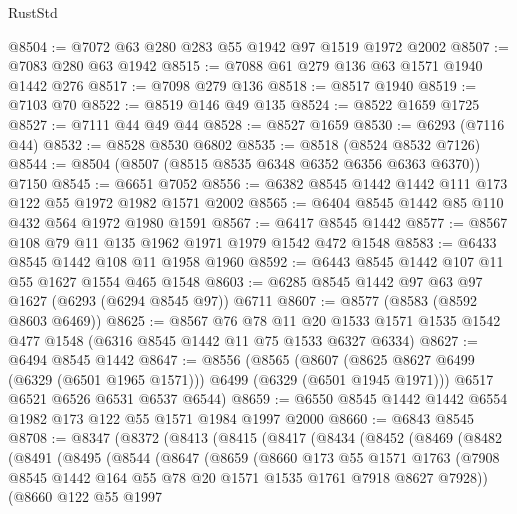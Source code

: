 \begin{lexlean}{RustStd}
\begin{coremodule}
{\begin{coremodule}
{{{{{{{{{{{{{{{{{{{{{{{{{{{{{{{{{{{@8504 := @7072 @63 @280 @283 @55 @1942 @97 @1519 @1972 @2002
@8507 := @7083 @280 @63 @1942
@8515 := @7088 @61 @279 @136 @63 @1571 @1940 @1442 @276
@8517 := @7098 @279 @136
@8518 := @8517 @1940
@8519 := @7103 @70
@8522 := @8519 @146 @49 @135
@8524 := @8522 @1659 @1725
@8527 := @7111 @44 @49 @44
@8528 := @8527 @1659
@8530 := @6293 (@7116 @44)
@8532 := @8528 @8530 @6802
@8535 := @8518 (@8524 @8532 @7126)
@8544 := @8504 (@8507 (@8515 @8535 @6348 @6352 @6356 @6363 @6370)) @7150
@8545 := @6651 @7052
@8556 := @6382 @8545 @1442 @1442 @111 @173 @122 @55 @1972 @1982 @1571 @2002
@8565 := @6404 @8545 @1442 @85 @110 @432 @564 @1972 @1980 @1591
@8567 := @6417 @8545 @1442
@8577 := @8567 @108 @79 @11 @135 @1962 @1971 @1979 @1542 @472 @1548
@8583 := @6433 @8545 @1442 @108 @11 @1958 @1960
@8592 := @6443 @8545 @1442 @107 @11 @55 @1627 @1554 @465 @1548
@8603 := @6285 @8545 @1442 @97 @63 @97 @1627 (@6293 (@6294 @8545 @97)) @6711
@8607 := @8577 (@8583 (@8592 @8603 @6469))
@8625 := @8567
    @76
    @78
    @11
    @20
    @1533
    @1571
    @1535
    @1542
    @477
    @1548
    (@6316 @8545 @1442 @11 @75 @1533 @6327 @6334)
@8627 := @6494 @8545 @1442
@8647 := @8556
    (@8565
      (@8607 (@8625 @8627 @6499 (@6329 (@6501 @1965 @1571))) @6499 (@6329 (@6501 @1945 @1971)))
      @6517
      @6521
      @6526
      @6531
      @6537
      @6544)
@8659 := @6550 @8545 @1442 @1442 @6554 @1982 @173 @122 @55 @1571 @1984 @1997 @2000
@8660 := @6843 @8545
@8708 := @8347
    (@8372
      (@8413
        (@8415
          (@8417
            (@8434
              (@8452
                (@8469
                  (@8482
                    (@8491
                      (@8495
                        (@8544
                          (@8647
                            (@8659
                              (@8660
                                @173
                                @55
                                @1571
                                @1763
                                (@7908
                                  @8545
                                  @1442
                                  @164
                                  @55
                                  @78
                                  @20
                                  @1571
                                  @1535
                                  @1761
                                  @7918
                                  @8627
                                  @7928))
                              (@8660
                                @122
                                @55
                                @1997
}}}}}}}}}}}}}}}}}}}}}}}}}}}}}}}}}}}
\end{coremodule}}
\end{coremodule}
\end{lexlean}
